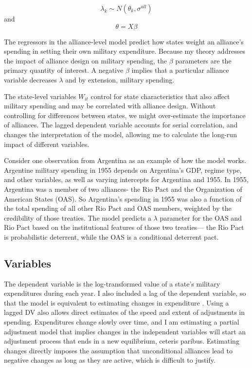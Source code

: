 \documentclass[12pt]{article}
\begin{document}
\begin{equation}
\lambda_k \sim N(\theta_k , \sigma^{all})
\end{equation} 
and 
\begin{equation}
\theta = X \beta
\end{equation}

The regressors in the alliance-level model predict how states weight an alliance's spending in setting their own military expenditure. Because my theory addresses the impact of alliance design on military spending, the $\beta$ parameters are the primary quantity of interest. A negative $\beta$ implies that a particular alliance variable decreases $\lambda$ and by extension, military spending.

The state-level variables $W_{it}$ control for state characteristics that also affect military spending and may be correlated with alliance design. Without controlling for differences between states, we might over-estimate the importance of alliances. The lagged dependent variable accounts for serial correlation, and changes the interpretation of the model, allowing me to calculate the long-run impact of different variables. 

Consider one observation from Argentina as an example of how the model works. Argentine military spending in 1955 depends on Argentina's GDP, regime type, and other variables, as well as varying intercepts for Argentina and 1955. In 1955, Argentina was a member of two alliances- the Rio Pact and the Organization of American States (OAS). So Argentina's spending in 1955 was also a function of the total spending of all other Rio Pact and OAS members, weighted by the credibility of those treaties. The model predicts a $\lambda$ parameter for the OAS and Rio Pact based on the institutional features of those two treaties--- the Rio Pact is probabilistic deterrent, while the OAS is a conditional deterrent pact. 

\subsection*{Variables} 

The dependent variable is the log-transformed value of a state's military expenditures during each year. I also included a lag of the dependent variable, so that the model is equivalent to estimating changes in expenditure \cite{DeBoefKeele2008}. Using a lagged DV also allows direct estimates of the speed and extent of adjustments in spending. Expenditures change slowly over time, and I am estimating a partial adjustment model that implies changes in the independent variables will start an adjustment process that ends in a new equilibrium, ceteris paribus. Estimating changes directly imposes the assumption that unconditional alliances lead to negative changes as long as they are active, which is difficult to justify. 
\end{document}
